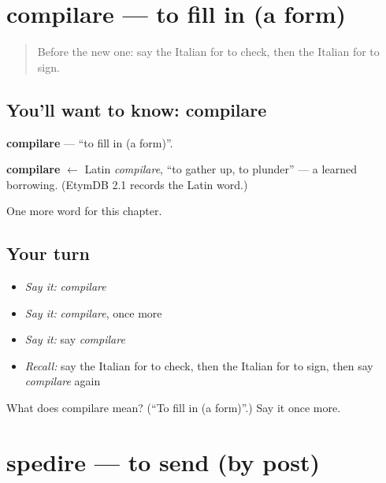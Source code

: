 \section[compilare]{compilare — to fill in (a form)}

\label{lesson:IT-C235-compilare}



\begin{quote}
Before the new one: say the Italian for to check, then the Italian for to sign.
\end{quote}

\subsection*{You'll want to know: compilare}
\textbf{compilare} — \textquotedblleft{}to fill in (a form)\textquotedblright{}.

\begin{cousinweb}
\textbf{compilare} $\leftarrow$ Latin \emph{compilare}, \textquotedblleft{}to gather up, to plunder\textquotedblright{} — a learned borrowing. (EtymDB 2.1 records the Latin word.)
\end{cousinweb}

\begin{grammarlens}[title={What you've built}]
One more word for this chapter.
\end{grammarlens}

\subsection*{Your turn}
\begin{itemize}
\raggedright
  \item \emph{Say it:} \emph{compilare}
  \item \emph{Say it:} \emph{compilare}, once more
  \item \emph{Say it:} say \emph{compilare}
  \item \emph{Recall:} say the Italian for to check, then the Italian for to sign, then say \emph{compilare} again
\end{itemize}

\begin{tcolorbox}[breakable,colback=teal!4,colframe=teal!35!black,title={Before you move on}]
What does compilare mean? (\textquotedblleft{}To fill in (a form)\textquotedblright{}.) Say it once more.
\end{tcolorbox}
\section[spedire]{spedire — to send (by post)}

